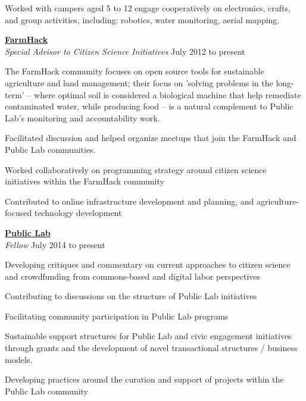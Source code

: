 \documentclass[10pt]{article}
\newcommand{\blankline}{\quad\pagebreak[3]}
\newcommand{\halfblankline}{\quad\vspace{-0.5\baselineskip}\pagebreak[3]}
\begin{document}
\halfblankline

Worked with campers aged 5 to 12 engage cooperatively on electronics, crafts, and group activities, including: robotics, water monitoring, aerial mapping.
   
\blankline

\href{http://FarmHack.net}{\textbf{FarmHack}}  \\
\emph{Special Advisor to Citizen Science Initiatives} \hfill {July 2012 to present}

\halfblankline

The FarmHack community focuses on open source tools for sustainable agriculture and land management; their focus on 'solving problems in the long-term' -- where optimal soil is considered a biological machine that help remediate contaminated water, while producing food -- is a natural complement to Public Lab's monitoring and accountability work.
\begin{innerlist}
\item Facilitated discussion and helped organize meetups that join the FarmHack and Public Lab communities. 
\item Worked collaboratively on programming strategy around citizen science initiatives within the FarmHack community
\item Contributed to online infrastructure development and planning, and agriculture-focused technology development
\end{innerlist}
   
\blankline

\href{http://publiclab.org}{\textbf{Public Lab}} \\
\emph{Fellow}  \hfill {July 2014 to present}

\halfblankline

\begin{innerlist}
\item Developing critiques and commentary on current approaches to citizen science and crowdfunding from commons-based and digital labor perspectives
\item Contributing to discussions on the structure of Public Lab initiatives
\item Facilitating community participation in Public Lab programs
\item Sustainable support structures for Public Lab and civic engagement initiatives through grants and the development of novel transactional structures / business models.
\item Developing practices around the curation and support of projects within the Public Lab community

\end{innerlist}
   
\end{document}
